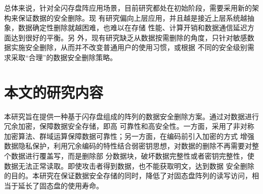 总体来说，针对全闪存盘阵应用场景，目前研究都处在初始阶段，需要采用新的架构来保证数据的安全删除\cite{傅颖勋2013安全云存储系统与关键技术综述}。现
有研究偏向上层应用，并且越是接近上层系统越抽象，数据确定性删除就越困难\cite{Reardon2013SoK}，也难以在存储
性能、计算开销和数据通信延迟方面达到很好的平衡\cite{李晖2014公共云存储服务数据安全及隐私保护技术综述}。另
外，现有研究缺乏从数据按需删除的角度，只针对敏感数据实施安全删除，从而并不改变普通用户的使用习惯，或根据
不同的安全级别需求采取“合理”的数据安全删除策略。
\section{本文的研究内容}
本研究旨在提供一种基于闪存盘组成的阵列的数据安全删除方案。通过对数据进行冗余加密，保障数据安全存储，即高
可靠性和高安全性。一方面，采用了非对称加密算法、群域运算保障数据可靠性；另一方面，在编码前引入加密的方式
增强数据隐私保护，利用冗余编码的特性结合弱密钥思想，对数据的删除不再需要对整个数据进行覆盖写，而是删除部
分数据块，破坏数据完整性或者密钥完整性，使数据无法正常读取。即使攻击者得到数据，也不能获取明文，达到数据
安全删除的目的。本研究在保证数据安全存储的同时，降低了对固态盘阵列的读写访问，相当于延长了固态盘的使用寿命。
